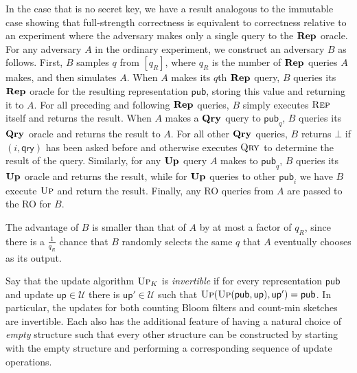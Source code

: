 \documentclass[11pt, pdftex]{article}
\newcommand{\REPO}{\oraclefont{Rep}}
\newcommand{\UPO}{\oraclefont{Up}}
\newcommand{\QRYO}{\oraclefont{Qry}}
\begin{document}
In the case that is no secret key, we have a result analogous to the immutable case showing that full-strength correctness is equivalent to correctness relative to an experiment where the adversary makes only a single query to the $\REPO$ oracle.  For any adversary $A$ in the ordinary experiment, we construct an adversary $B$ as follows. First, $B$ samples $q$ from $[q_R]$, where $q_R$ is the number of $\REPO$ queries $A$ makes, and then simulates $A$. When $A$ makes its $q$th $\REPO$ query, $B$ queries its $\REPO$ oracle for the resulting representation $\mathsf{pub}$, storing this value and returning it to $A$. For all preceding and following $\REPO$ queries, $B$ simply executes $\textsc{Rep}$ itself and returns the result. When $A$ makes a $\QRYO$ query to $\mathsf{pub}_q$, $B$ queries its $\QRYO$ oracle and returns the result to $A$. For all other $\QRYO$ queries, $B$ returns $\bot$ if $(i,\mathsf{qry})$ has been asked before and otherwise executes $\textsc{Qry}$ to determine the result of the query. Similarly, for any $\UPO$ query $A$ makes to $\mathsf{pub}_q$, $B$ queries its $\UPO$ oracle and returns the result, while for $\UPO$ queries to other $\mathsf{pub}_i$ we have $B$ execute $\textsc{Up}$ and return the result. Finally, any RO queries from $A$ are passed to the RO for $B$.

The advantage of $B$ is smaller than that of $A$ by at most a factor of $q_R$, since there is a $\frac{1}{q_R}$ chance that $B$ randomly selects the same $q$ that $A$ eventually chooses as its output.

Say that the update algorithm $\textsc{Up}_K$ is {\em invertible} if for every representation $\mathsf{pub}$ and update $\mathsf{up} \in \mathcal{U}$ there is $\mathsf{up}' \in \mathcal{U}$ such that $\textsc{Up}(\textsc{Up}(\mathsf{pub},\mathsf{up}),\mathsf{up}') = \mathsf{pub}$.  In particular, the updates for both counting Bloom filters and count-min sketches are invertible. Each also has the additional feature of having a natural choice of {\em empty} structure such that every other structure can be constructed by starting with the empty structure and performing a corresponding sequence of update operations.
\end{document}
